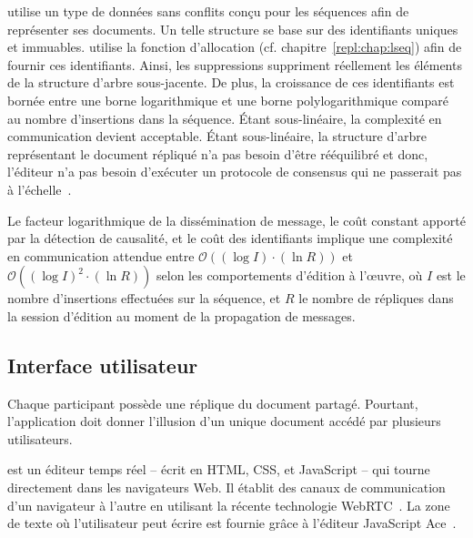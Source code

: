 \CRATE utilise un type de données sans conflits conçu pour les
séquences afin de représenter ses documents. Un telle structure se base sur des
identifiants uniques et immuables. \CRATE utilise la fonction d'allocation \LSEQ
(cf. chapitre~\ref{repl:chap:lseq}) afin de fournir ces identifiants. Ainsi, les
suppressions suppriment réellement les éléments de la structure d'arbre
sous-jacente. De plus, la croissance de ces identifiants est bornée entre une
borne logarithmique et une borne polylogarithmique comparé au nombre
d'insertions dans la séquence. Étant sous-linéaire, la complexité en
communication devient acceptable. Étant sous-linéaire, la structure d'arbre
représentant le document répliqué n'a pas besoin d'être rééquilibré et donc,
l'éditeur n'a pas besoin d'exécuter un protocole de consensus qui ne passerait
pas à l'échelle~\cite{mostefaoui2015signature}.

Le facteur logarithmique de la dissémination de message, le coût constant
apporté par la détection de causalité, et le coût des identifiants implique une
complexité en communication attendue entre $\mathcal{O}((\log I)\cdot (\ln R))$ et
$\mathcal{O}((\log I)^2\cdot(\ln R))$ selon les comportements d'édition à l'œuvre,
où $I$ est le nombre d'insertions effectuées sur la séquence, et $R$ le nombre
de répliques dans la session d'édition au moment de la propagation de messages.


\subsection{Interface utilisateur}

Chaque participant possède une réplique du document partagé. Pourtant,
l'application doit donner l'illusion d'un unique document accédé par plusieurs
utilisateurs.

\CRATE est un éditeur temps réel -- écrit en HTML, CSS, et JavaScript -- qui
tourne directement dans les navigateurs Web. Il établit des canaux de
communication d'un navigateur à l'autre en utilisant la récente technologie
WebRTC~\cite{webrtc}. La zone de texte où l'utilisateur peut écrire est fournie
grâce à l'éditeur JavaScript Ace~\cite{ace}.



